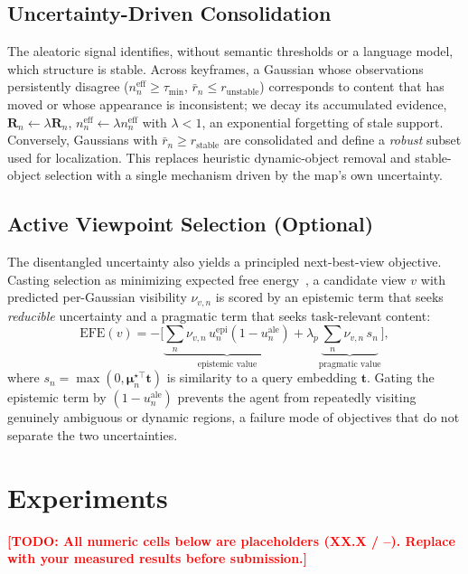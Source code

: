 \documentclass[journal]{IEEEtran}
\newcommand{\todo}[1]{\textcolor{red}{\textbf{[TODO: #1]}}}
\newcommand{\ph}{\textcolor{red}{XX.X}}      %
\newcommand{\R}{\mathbf{R}}
\newcommand{\muv}{\boldsymbol{\mu}}
\begin{document}
\subsection{Uncertainty-Driven Consolidation}
\label{sec:consolidation}
The aleatoric signal identifies, without semantic thresholds or a language model,
which structure is stable. Across keyframes, a Gaussian whose observations
persistently disagree ($n^{\mathrm{eff}}_n\!\geq\!\tau_{\min}$, $\bar r_n \leq
r_{\mathrm{unstable}}$) corresponds to content that has moved or whose appearance
is inconsistent; we decay its accumulated evidence,
$\R_n \leftarrow \lambda \R_n$, $n^{\mathrm{eff}}_n \leftarrow \lambda
n^{\mathrm{eff}}_n$ with $\lambda<1$, an exponential forgetting of stale support.
Conversely, Gaussians with $\bar r_n \geq r_{\mathrm{stable}}$ are consolidated
and define a \emph{robust} subset used for localization. This replaces heuristic
dynamic-object removal and stable-object selection with a single mechanism driven
by the map's own uncertainty.

\subsection{Active Viewpoint Selection (Optional)}
\label{sec:efe}
The disentangled uncertainty also yields a principled next-best-view objective.
Casting selection as minimizing expected free energy~\cite{friston2010}, a
candidate view $v$ with predicted per-Gaussian visibility $\nu_{v,n}$ is scored
by an epistemic term that seeks \emph{reducible} uncertainty and a pragmatic term
that seeks task-relevant content:
\begin{equation}
\mathrm{EFE}(v) = -\Big[\underbrace{\sum_n \nu_{v,n}\,u^{\mathrm{epi}}_n
(1-u^{\mathrm{ale}}_n)}_{\text{epistemic value}}
+ \lambda_p \underbrace{\sum_n \nu_{v,n}\,s_n}_{\text{pragmatic value}}\Big],
\end{equation}
where $s_n=\max(0,\muv^{\star\top}_n \mathbf{t})$ is similarity to a query
embedding $\mathbf{t}$. Gating the epistemic term by $(1-u^{\mathrm{ale}}_n)$
prevents the agent from repeatedly visiting genuinely ambiguous or dynamic
regions, a failure mode of objectives that do not separate the two uncertainties.

\section{Experiments}
\todo{All numeric cells below are placeholders (\ph{} / --). Replace with your
measured results before submission.}
\end{document}

